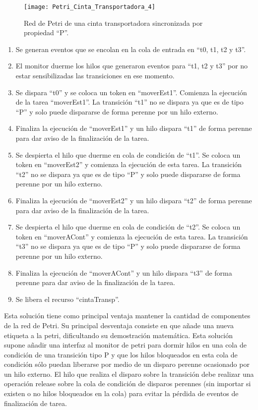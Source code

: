 \begin{figure}[H]
    \centering
    \texttt{[image: Petri\_Cinta\_Transportadora\_4]}
    \caption{Red de Petri de una cinta transportadora sincronizada por
    propiedad ``P''.}
    \label{fig:petri_cinta_transportadora_4}
\end{figure}

\begin{enumerate}
    \item Se generan eventos que se encolan en la cola de entrada en “t0, t1,
    t2 y t3”.
	\item El monitor duerme los hilos que generaron eventos para “t1, t2 y t3” por
	no estar sensibilizadas las transiciones en ese momento.
	\item Se dispara ``t0'' y se coloca un token en ``moverEst1''. Comienza la
	ejecución de la tarea ``moverEst1''. La transición ``t1'' no se dispara ya que
	es de tipo ``P'' y solo puede dispararse de forma perenne por un hilo externo.
	\item Finaliza la ejecución de ``moverEst1'' y un hilo dispara ``t1'' de forma
	perenne para dar aviso de la finalización de la tarea.
	\item Se despierta el hilo que
	duerme en cola de condición de ``t1''. Se coloca un token en ``moverEst2'' y
	comienza la ejecución de esta tarea. La transición ``t2'' no se dispara ya que
	es de tipo ``P'' y solo puede dispararse de forma perenne por un hilo externo.
	\item Finaliza la ejecución de ``moverEst2'' y un hilo dispara ``t2'' de forma
	perenne para dar aviso de la finalización de la tarea.
	\item  Se despierta el hilo que
	duerme en cola de condición de ``t2''. Se coloca un token en ``moverACont'' y
	comienza la ejecución de esta tarea. La transición ``t3'' no se dispara ya que
	es de tipo ``P'' y solo puede dispararse de forma perenne por un hilo externo.
	\item Finaliza la ejecución de ``moverACont'' y un hilo dispara ``t3'' de forma
	perenne para dar aviso de la finalización de la tarea.
	\item Se libera el recurso ``cintaTransp''.
\end{enumerate}

Esta solución tiene como principal ventaja mantener la cantidad de componentes
de la red de Petri.
Su principal desventaja consiste en que añade una nueva etiqueta a la
petri, dificultando su demostración matemática. Esta solución supone añadir una
interfaz al monitor de petri para dormir hilos en una cola de condición de una
transición tipo P y que los hilos bloqueados en esta cola de condición sólo
puedan liberarse por medio de un disparo perenne ocasionado por un hilo externo.
El hilo que realiza el disparo sobre la transición debe realizar una operación
release sobre la cola de condición de disparos perennes (sin importar si existen
o no hilos bloqueados en la cola) para evitar la pérdida de eventos de
finalización de tarea.

